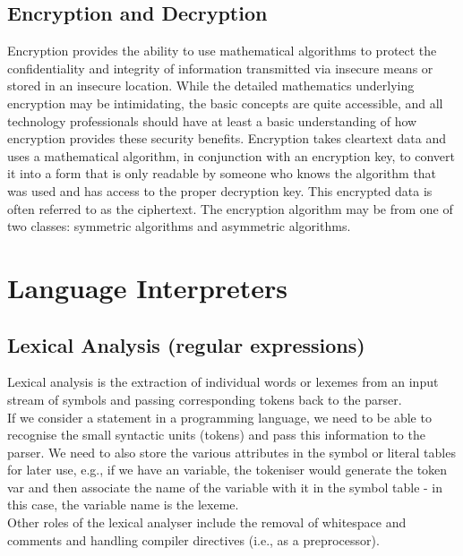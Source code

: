 \subsection{Encryption and Decryption}
Encryption provides the ability to use mathematical
algorithms to protect the confidentiality and integrity of
information transmitted via insecure means or stored in an
insecure location. While the detailed mathematics underlying
encryption may be intimidating, the basic concepts are quite
accessible, and all technology professionals should have at
least a basic understanding of how encryption provides these
security benefits.
Encryption takes cleartext data and uses a mathematical
algorithm, in conjunction with an encryption key, to convert
it into a form that is only readable by someone who knows
the algorithm that was used and has access to the proper
decryption key. This encrypted data is often referred to
as the ciphertext. The encryption algorithm may be from
one of two classes: symmetric algorithms and asymmetric
algorithms.



\section{Language Interpreters}

\subsection{Lexical Analysis (regular expressions)}


Lexical analysis is the extraction of individual words or lexemes from an input stream of symbols and passing corresponding tokens back to the parser.\\

If we consider a statement in a programming language, we need to be able to recognise the small syntactic units (tokens) and pass this information to the parser. We need to also store the various attributes in the symbol or literal tables for later use, e.g., if we have an variable, the tokeniser would generate the token var and then associate the name of the variable with it in the symbol table - in this case, the variable name is the lexeme.\\

Other roles of the lexical analyser include the removal of whitespace and comments and handling compiler directives (i.e., as a preprocessor).\\

